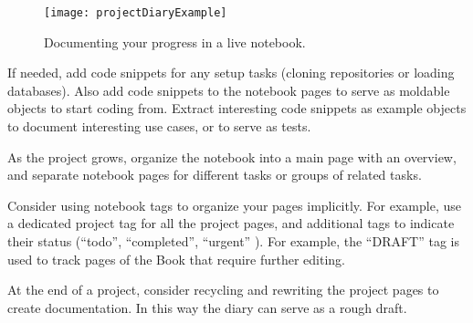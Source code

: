 \documentclass[sigconf]{acmart}
\renewcommand{\nbc}[3]{} %
\newcommand\kh[1]{\nbc{Konrad}{#1}{violet}}
\newcommand\eog[1]{\nbc{Edward}{#1}{purple}}
\newcommand{\GT}{\lst{GT}\xspace} %
\begin{document}
\eog{``Using a live notebook.'' I know folks maybe in like Jupiter like Python stuff but specific kind of like scientific Python are used to using this word or this phrase, but I would explain it or define it if you can, if you if you have the space.}

\begin{figure}[h]
  \texttt{[image: projectDiaryExample]}
  \caption{Documenting your progress in a live notebook.}
  \label{fig:projectDiary}
\end{figure}

If needed, add code snippets for any setup tasks (\eg cloning repositories or loading databases).
Also add code snippets to the notebook pages to serve as moldable objects to start coding from.
Extract interesting code snippets as example objects to document interesting use cases, or to serve as tests.

As the project grows, organize the notebook into a main page with an overview, and separate notebook pages for different tasks or groups of related tasks.

Consider using notebook tags to organize your pages implicitly. For example, use a dedicated project tag for all the project pages, and additional tags to indicate their status (``todo'', ``completed'', ``urgent'' \etc).
For example, the ``DRAFT'' tag is used to track pages of the \GT Book that require further editing.

At the end of a project, consider recycling and rewriting the project pages to create documentation. In this way the diary can serve as a rough draft.

\kh{The "Project Diary" pattern is a very useful one, and also heavily used
in other contexts (in science we call it a "lab notebook"). But there is
one aspect of it to which is more an ideal than reality: "At the end of
a project, consider recycling and rewriting the project pages to create
documentation. In this way the diary can serve as a rough draft." In my
experience, this rarely happens, and Lepiter supports it even less than
other tools. Typically you want to keep the diary for yourself as a
historical record, so morphing it into documentation for others by
successive edits is not a good approach. Ideally, I'd want to be able to
mark parts of it for inclusion in a new document that I'd then edit, but
I haven't yet seen any support for this. In practice, documentation gets
written from scratch, with the diary serving only as a source of
detailed information to be copy-pasted. Maybe one day we will see
refactoring tools for prose.}
\end{document}
